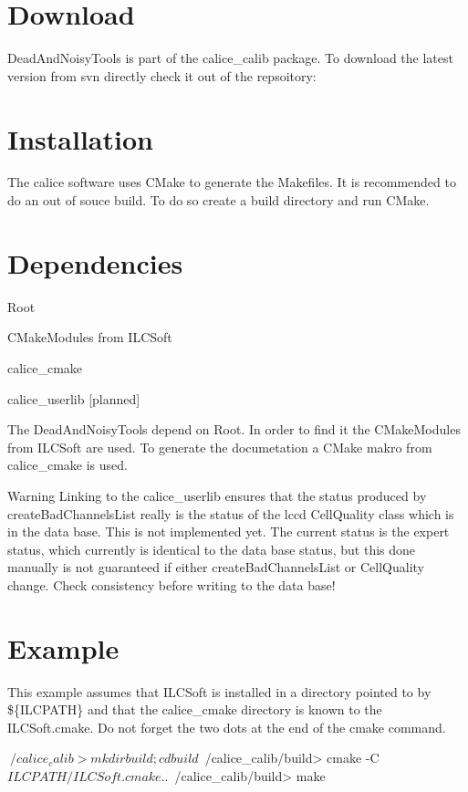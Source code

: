 \hypertarget{downloadinstall_Download}{}\section{Download}\label{downloadinstall_Download}
DeadAndNoisyTools is part of the calice\_\-calib package. To download the latest version from svn directly check it out of the repsoitory: 
\hypertarget{downloadinstall_Installation}{}\section{Installation}\label{downloadinstall_Installation}
The calice software uses CMake to generate the Makefiles. It is recommended to do an out of souce build. To do so create a build directory and run CMake.\hypertarget{downloadinstall_Dependencies}{}\section{Dependencies}\label{downloadinstall_Dependencies}
\begin{DoxyItemize}
\item Root \item CMakeModules from ILCSoft \item calice\_\-cmake \item calice\_\-userlib \mbox{[}planned\mbox{]}\end{DoxyItemize}
The DeadAndNoisyTools depend on Root. In order to find it the CMakeModules from ILCSoft are used. To generate the documetation a CMake makro from calice\_\-cmake is used.

\begin{DoxyWarning}{Warning}
Linking to the calice\_\-userlib ensures that the status produced by createBadChannelsList really is the status of the lccd {\ttfamily CellQuality} class which is in the data base. This is not implemented yet. The current status is the expert status, which currently is identical to the data base status, but this done manually is not guaranteed if either createBadChannelsList or {\ttfamily CellQuality} change. Check consistency before writing to the data base!
\end{DoxyWarning}
\hypertarget{downloadinstall_installExample}{}\section{Example}\label{downloadinstall_installExample}
This example assumes that ILCSoft is installed in a directory pointed to by \$\{ILCPATH\} and that the calice\_\-cmake directory is known to the ILCSoft.cmake. Do not forget the two dots at the end of the cmake command. 
\begin{DoxyCode}
$~/calice_calib> mkdir build; cd build
$~/calice_calib/build> cmake -C ${ILCPATH}/ILCSoft.cmake ..
$~/calice_calib/build> make
\end{DoxyCode}
 